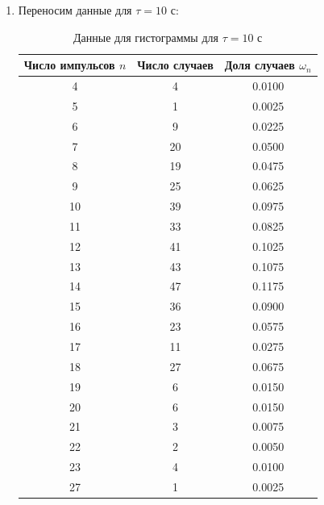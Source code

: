 \documentclass[a4paper, 12pt]{article}
\begin{document}
\begin{enumerate}
		\item Переносим данные для $\tau = 10$ с:
		\begin{table}[H]
			\centering
			\caption{Данные для гистограммы для $\tau = 10$ с}
			\begin{tabular}{|c|c|c|}
			\hline
			Число импульсов $n$ & Число случаев & Доля случаев $\omega_n$  \\ \hline
			4                   & 4             & 0.0100                   \\ \hline
			5                   & 1             & 0.0025                   \\ \hline
			6                   & 9             & 0.0225                   \\ \hline
			7                   & 20            & 0.0500                   \\ \hline
			8                   & 19            & 0.0475                   \\ \hline
			9                   & 25            & 0.0625                   \\ \hline
			10                  & 39            & 0.0975                   \\ \hline
			11                  & 33            & 0.0825                   \\ \hline
			12                  & 41            & 0.1025                   \\ \hline
			13                  & 43            & 0.1075                   \\ \hline
			14                  & 47            & 0.1175                   \\ \hline
			15                  & 36            & 0.0900                   \\ \hline
			16                  & 23            & 0.0575                   \\ \hline
			17                  & 11            & 0.0275                   \\ \hline
			18                  & 27            & 0.0675                   \\ \hline
			19                  & 6             & 0.0150                   \\ \hline
			20                  & 6             & 0.0150                   \\ \hline
			21                  & 3             & 0.0075                   \\ \hline
			22                  & 2             & 0.0050                   \\ \hline
			23                  & 4             & 0.0100                   \\ \hline
			27                  & 1             & 0.0025                   \\ \hline
			\end{tabular}
		\end{table}


\end{enumerate}
\end{document}

